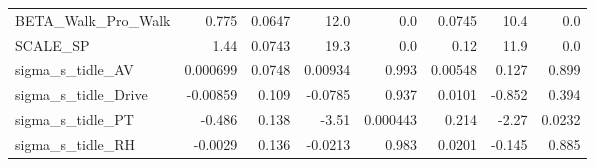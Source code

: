 \begin{tabular}{lrrrrrrr}
BETA\_Walk\_Pro\_Walk           &    0.775 &   0.0647 &    12.0 &      0.0 &        0.0745 &         10.4 &           0.0 \\
SCALE\_SP                     &     1.44 &   0.0743 &    19.3 &      0.0 &          0.12 &         11.9 &           0.0 \\
sigma\_s\_tidle\_AV             & 0.000699 &   0.0748 & 0.00934 &    0.993 &       0.00548 &        0.127 &         0.899 \\
sigma\_s\_tidle\_Drive          & -0.00859 &    0.109 & -0.0785 &    0.937 &        0.0101 &       -0.852 &         0.394 \\
sigma\_s\_tidle\_PT             &   -0.486 &    0.138 &   -3.51 & 0.000443 &         0.214 &        -2.27 &        0.0232 \\
sigma\_s\_tidle\_RH             &  -0.0029 &    0.136 & -0.0213 &    0.983 &        0.0201 &       -0.145 &         0.885 \\
\bottomrule
\end{tabular}

